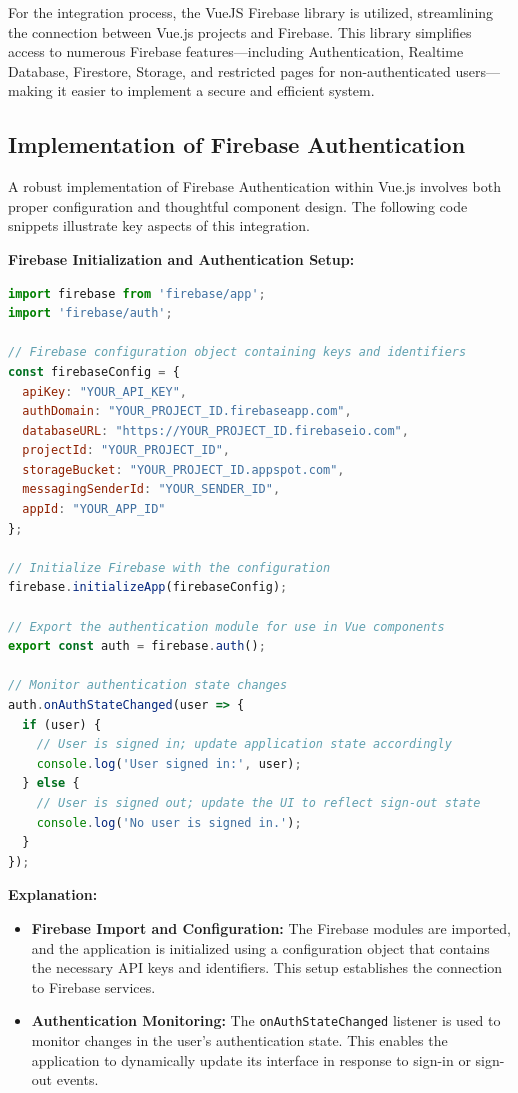 For the integration process, the VueJS Firebase library is utilized, streamlining the connection between Vue.js projects and Firebase. This library simplifies access to numerous Firebase features—including Authentication, Realtime Database, Firestore, Storage, and restricted pages for non-authenticated users—making it easier to implement a secure and efficient system.

\subsection{Implementation of Firebase Authentication}

A robust implementation of Firebase Authentication within Vue.js involves both proper configuration and thoughtful component design. The following code snippets illustrate key aspects of this integration.

\vspace{1em}
\textbf{Firebase Initialization and Authentication Setup:}

\begin{lstlisting}[language=JavaScript, caption={Initializing Firebase and setting up authentication}]
import firebase from 'firebase/app';
import 'firebase/auth';

// Firebase configuration object containing keys and identifiers
const firebaseConfig = {
  apiKey: "YOUR_API_KEY",
  authDomain: "YOUR_PROJECT_ID.firebaseapp.com",
  databaseURL: "https://YOUR_PROJECT_ID.firebaseio.com",
  projectId: "YOUR_PROJECT_ID",
  storageBucket: "YOUR_PROJECT_ID.appspot.com",
  messagingSenderId: "YOUR_SENDER_ID",
  appId: "YOUR_APP_ID"
};

// Initialize Firebase with the configuration
firebase.initializeApp(firebaseConfig);

// Export the authentication module for use in Vue components
export const auth = firebase.auth();

// Monitor authentication state changes
auth.onAuthStateChanged(user => {
  if (user) {
    // User is signed in; update application state accordingly
    console.log('User signed in:', user);
  } else {
    // User is signed out; update the UI to reflect sign-out state
    console.log('No user is signed in.');
  }
});
\end{lstlisting}

\vspace{1em}
\textbf{Explanation:}
\begin{itemize}
    \item \textbf{Firebase Import and Configuration:} The Firebase modules are imported, and the application is initialized using a configuration object that contains the necessary API keys and identifiers. This setup establishes the connection to Firebase services.
    \item \textbf{Authentication Monitoring:} The \texttt{onAuthStateChanged} listener is used to monitor changes in the user’s authentication state. This enables the application to dynamically update its interface in response to sign-in or sign-out events.
\end{itemize}

